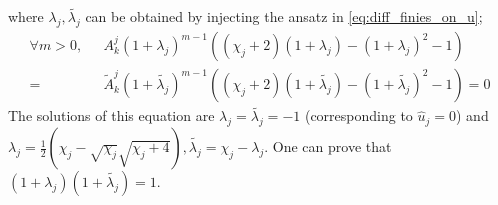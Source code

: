 where $\lambda_j, \widetilde{\lambda_j}$ can be obtained by injecting
the ansatz in \eqref{eq:diff_finies_on_u};
\begin{equation*}
\begin{aligned}
\forall m>0,~~~ &A_k^j\left(1+\lambda_j\right)^{m-1}
\left((\chi_j+2) (1+\lambda_j) - (1+\lambda_j)^2 - 1\right)\\
=&
\widetilde{A}_k^j\left(1+\widetilde{\lambda_j}\right)^{m-1}
\left((\chi_j+2) (1+\widetilde{\lambda_j}) - (1+\widetilde{\lambda_j})^2 - 1\right) = 0
\end{aligned}
\end{equation*}
The solutions of this equation are
$\lambda_j=\widetilde{\lambda_j}=-1$ (corresponding to
$\widehat{u}_j=0$) and
$\lambda_j =
\frac{1}{2}\left(\chi_j - \sqrt{\chi_j}\sqrt{\chi_j+4}\right),
\widetilde{\lambda_j}=\chi_j - \lambda_j$. One can prove
that $(1+\lambda_j)(1+\widetilde{\lambda_j}) = 1$.

